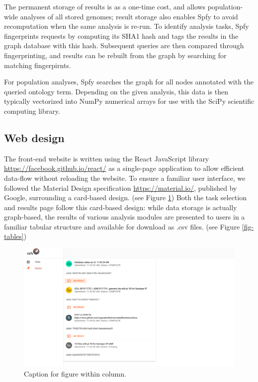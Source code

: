 \documentclass[a4,center,fleqn]{NAR}
\begin{document}
The permanent storage of results is as a one-time cost, and allows population-wide analyses of all stored genomes; result storage also enables Spfy to avoid recomputation when the same analysis is re-run. To identify analysis tasks, Spfy fingerprints requests by computing its SHA1 hash and tags the results in the graph database with this hash. Subsequent queries are then compared through fingerprinting, and results can be rebuilt from the graph by searching for matching fingerpirnts.

For population analyses, Spfy searches the graph for all nodes annotated with the queried ontology term. Depending on the given analysis, this data is then typically vectorized into NumPy numerical arrays for use with the SciPy scientific computing library.

\subsection{Web design}

The front-end website is written using the React JavaScript library \url{https://facebook.github.io/react/} as a single-page application to allow efficient data-flow without reloading the website.
To ensure a familiar user interface, we followed the Material Design specification \url{https://material.io/}, published by Google, surrounding a card-based design.
(see Figure \ref{fig-results})
Both the task selection and results page follow this card-based design: while data storage is actually graph-based, the results of various analysis modules are presented to users in a familiar tabular structure and available for download as .csv files.
(see Figure \ref{fig-tables})

\begin{figure}[t]
\begin{center}
\includegraphics{images/results.png}
\end{center}
\caption{Caption for figure within column.}
\label{fig-results}
\end{figure}
\end{document}

